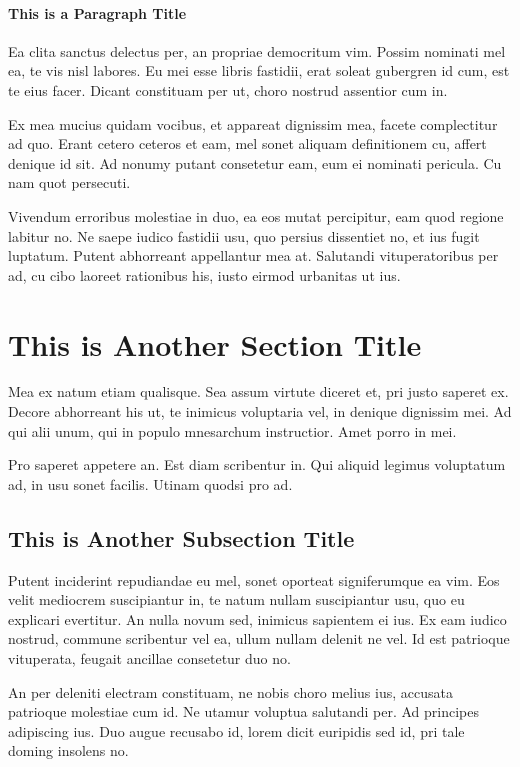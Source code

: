 \paragraph{This is a Paragraph Title}

Ea clita sanctus delectus per, an propriae democritum vim. Possim nominati mel
ea, te vis nisl labores. Eu mei esse libris fastidii, erat soleat gubergren id
cum, est te eius facer. Dicant constituam per ut, choro nostrud assentior cum
in.

Ex mea mucius quidam vocibus, et appareat dignissim mea, facete complectitur ad
quo. Erant cetero ceteros et eam, mel sonet aliquam definitionem cu, affert
denique id sit. Ad nonumy putant consetetur eam, eum ei nominati pericula. Cu
nam quot persecuti.

Vivendum erroribus molestiae in duo, ea eos mutat percipitur, eam quod regione
labitur no. Ne saepe iudico fastidii usu, quo persius dissentiet no, et ius
fugit luptatum. Putent abhorreant appellantur mea at. Salutandi vituperatoribus
per ad, cu cibo laoreet rationibus his, iusto eirmod urbanitas ut ius.

\section{This is Another Section Title}

Mea ex natum etiam qualisque. Sea assum virtute diceret et, pri justo saperet
ex. Decore abhorreant his ut, te inimicus voluptaria vel, in denique dignissim
mei. Ad qui alii unum, qui in populo mnesarchum instructior. Amet porro in mei.

Pro saperet appetere an. Est diam scribentur in. Qui aliquid legimus voluptatum
ad, in usu sonet facilis. Utinam quodsi pro ad.

\subsection{This is Another Subsection Title}

Putent inciderint repudiandae eu mel, sonet oporteat signiferumque ea vim. Eos
velit mediocrem suscipiantur in, te natum nullam suscipiantur usu, quo eu
explicari evertitur. An nulla novum sed, inimicus sapientem ei ius. Ex eam
iudico nostrud, commune scribentur vel ea, ullum nullam delenit ne vel. Id est
patrioque vituperata, feugait ancillae consetetur duo no.

An per deleniti electram constituam, ne nobis choro melius ius, accusata
patrioque molestiae cum id. Ne utamur voluptua salutandi per. Ad principes
adipiscing ius. Duo augue recusabo id, lorem dicit euripidis sed id, pri tale
doming insolens no.

